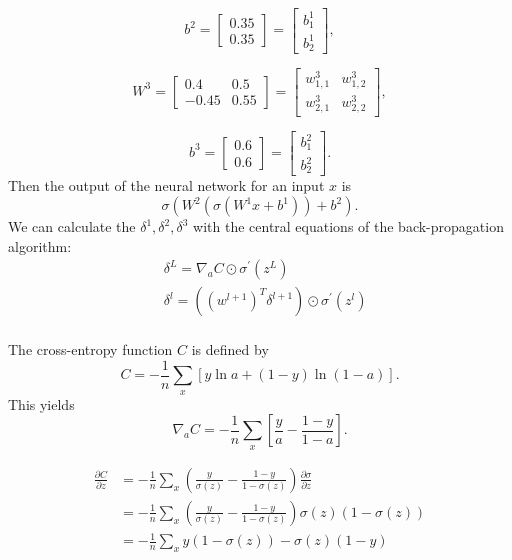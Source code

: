 \documentclass{article}
\begin{document}
$$
 b^2 = \begin{bmatrix}
  0.35  \\
  0.35 
\end{bmatrix}= \begin{bmatrix}
  b^1_1  \\
  b^1_2 
\end{bmatrix},
$$


$$
W^3=
\begin{bmatrix}
  0.4 &  0.5\\
  -0.45 & 0.55
\end{bmatrix}=\begin{bmatrix}
  w^3_{1,1} & w^3_{1,2} \\
  w^3_{2,1} & w^3_{2,2}
\end{bmatrix},
$$

$$
 b^3 = \begin{bmatrix}
  0.6  \\
  0.6 
\end{bmatrix}= \begin{bmatrix}
  b^2_1  \\
  b^2_2 
\end{bmatrix}.
$$
Then the output of the neural network for an input $x$ is 
$$\sigma(W^2(\sigma(W^1x+b^1))+b^2).$$
We can calculate the $\delta^1,\delta^2, \delta^3$ with the central equations of the back-propagation algorithm:
$$
\begin{aligned}
& \delta^L=\nabla_a C \odot \sigma^{\prime}\left(z^L\right) \\
& \delta^l=\left(\left(w^{l+1}\right)^T \delta^{l+1}\right) \odot \sigma^{\prime}\left(z^l\right) \\
\end{aligned}
$$

The cross-entropy function $C$ is defined by
$$
C=-\frac{1}{n} \sum_x[y \ln a+(1-y) \ln (1-a)].
$$
This yields 
$$
\nabla_a C=-\frac{1}{n} \sum_x\left[\frac{y}{a} -\frac{1-y}{1-a} \right].
$$

$$
\begin{aligned}
	\frac{\partial C}{\partial z}&=-\frac{1}{n} \sum_x\left(\frac{y}{\sigma(z)}-\frac{1-y}{1-\sigma(z)}\right) \frac{\partial \sigma}{\partial z}
	\\&=-\frac{1}{n} \sum_x\left(\frac{y}{\sigma(z)}-\frac{1-y}{1-\sigma(z)}\right) \sigma(z)(1-\sigma(z))
	\\&=-\frac{1}{n} \sum_x y(1-\sigma(z)) -\sigma(z) (1-y)
	\end{aligned}
$$
\end{document}
